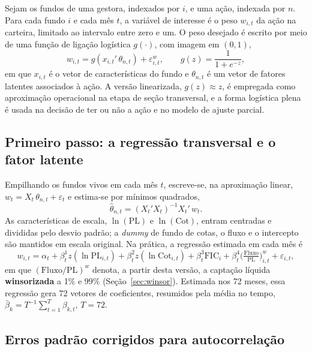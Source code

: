 \documentclass[12pt,a4paper]{article}
\begin{document}
Sejam os fundos de uma gestora, indexados por $i$, e uma ação, indexada por $n$. Para cada fundo
$i$ e cada mês $t$, a variável de interesse é o peso $w_{i,t}$ da ação na carteira, limitado ao
intervalo entre zero e um. O peso desejado é escrito por meio de uma função de ligação
logística $g(\cdot)$, com imagem em $(0,1)$,
\begin{equation}
w_{i,t} = g\!\left(x_{i,t}'\,\theta_{n,t}\right) + \varepsilon^{w}_{i,t},
\qquad g(z)=\frac{1}{1+e^{-z}},
\label{eq:logit}
\end{equation}
em que $x_{i,t}$ é o vetor de características do fundo e $\theta_{n,t}$ é um vetor de fatores
latentes associados à ação. A versão linearizada, $g(z)\approx z$, é empregada como aproximação
operacional na etapa de seção transversal, e a forma logística plena é usada na decisão de ter
ou não a ação e no modelo de ajuste parcial.

\subsection{Primeiro passo: a regressão transversal e o fator latente}
\label{sec:cs}

Empilhando os fundos vivos em cada mês $t$, escreve-se, na aproximação linear,
$w_t = X_t\,\theta_{n,t} + \varepsilon_t$ e estima-se por mínimos quadrados,
\begin{equation}
\widehat{\theta}_{n,t} = (X_t'X_t)^{-1}X_t'\,w_t.
\label{eq:ols}
\end{equation}
As características de escala, $\ln(\text{PL})$ e $\ln(\text{Cot})$, entram centradas e divididas
pelo desvio padrão; a \emph{dummy} de fundo de cotas, o fluxo e o intercepto são mantidos em
escala original. Na prática, a regressão estimada em cada mês é
\begin{equation}
w_{i,t} = \alpha_t + \beta^{1}_t z(\ln\text{PL}_{i,t}) + \beta^{2}_t z(\ln\text{Cot}_{i,t})
        + \beta^{3}_t \text{FIC}_i + \beta^{4}_t \Big(\tfrac{\text{Fluxo}}{\text{PL}}\Big)^{w}_{i,t}
        + \varepsilon_{i,t},
\label{eq:cs}
\end{equation}
em que $(\text{Fluxo}/\text{PL})^{w}$ denota, a partir desta versão, a captação líquida
\textbf{winsorizada} a 1\% e 99\% (Seção~\ref{sec:winsor}). Estimada nos 72 meses, essa
regressão gera 72 vetores de coeficientes, resumidos pela média no tempo,
$\bar{\beta}_k = T^{-1}\sum_{t=1}^{T}\beta_{k,t}$, $T=72$.

\subsection{Erros padrão corrigidos para autocorrelação}
\label{sec:nw}
\end{document}
